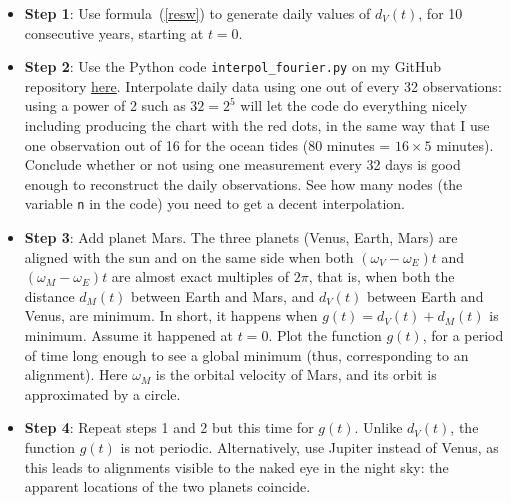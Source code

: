 \documentclass[oneside,10pt]{book}
\begin{document}
\begin{itemize}
\item[] {\bf Step 1}:  Use formula~(\ref{resw}) to generate daily values of $d_V(t)$, for 10 consecutive years, starting at $t=0$. \vspace{1ex}
\item[] {\bf Step 2}:  Use the Python code \texttt{interpol\_fourier.py} on my GitHub repository \href{https://github.com/VincentGranville/Statistical-Optimization/blob/main/interpol_fourier.py}{here}. Interpolate daily data using one out of every 32 observations: using a power of 2 such as $32=2^5$ will let the code do everything nicely including producing the chart with the red dots, in the same way that I use one observation out of 16 for the ocean tides (80 minutes = $16 \times 5$ minutes). Conclude whether or not using one measurement every 32 days is good enough to reconstruct the daily observations. See how many nodes (the variable \texttt{n} in the code) you need to get a decent interpolation. \vspace{1ex} 
\item[] {\bf Step 3}:  Add planet Mars. The three planets (Venus, Earth, Mars) are aligned with the sun and on the same side when both $(\omega_V-\omega_E)t$ and $(\omega_M-\omega_E)t$ are almost exact multiples of $2\pi$, that is, when both the distance $d_M(t)$ between Earth and Mars, and $d_V(t)$ between Earth and Venus, are minimum. In short, it happens when 
$g(t) = d_V(t) + d_M(t)$ is minimum.  Assume it happened at $t=0$. Plot the function $g(t)$, for a period of time long enough to see a global minimum (thus, corresponding to an alignment). Here $\omega_M$ is the orbital velocity of Mars, and its orbit is approximated by a circle. \vspace{1ex}
\item[] {\bf Step 4}: Repeat steps 1 and 2 but this time for $g(t)$. Unlike $d_V(t)$, the function $g(t)$ is not periodic. Alternatively, use Jupiter instead of Venus, as this leads to alignments visible to the naked eye in the night sky: the apparent locations of the two planets coincide. \vspace{1ex}


\end{itemize}
\end{document}
